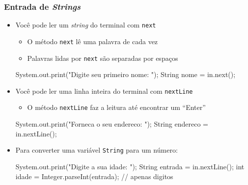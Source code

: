 \documentclass[xcolor={dvipsnames,table},aspectratio=169]{beamer}
\begin{document}
\begin{frame}[fragile]\frametitle{Entrada de \emph{Strings}}
\begin{itemize}
	\item Você pode ler um \emph{string} do terminal com \texttt{next}
	\begin{itemize}
		\item O método \texttt{next} lê uma palavra de cada vez
		\item Palavras lidas por \texttt{next} são separadas por espaços
	\end{itemize}
{\scriptsize
\begin{javacode}
System.out.print("Digite seu primeiro nome: ");
String nome = in.next();
\end{javacode}
}
	\item Você pode ler uma linha inteira do terminal com \texttt{nextLine}
	\begin{itemize}
		\item O método \texttt{nextLine} faz a leitura até encontrar um ``Enter''
	\end{itemize}
{\scriptsize
\begin{javacode}
System.out.print("Forneca o seu endereco: ");
String endereco = in.nextLine();
\end{javacode}
}
	\item Para converter uma variável \texttt{String} para um número:
{\scriptsize
\begin{javacode}
System.out.print("Digite a sua idade: ");
String entrada = in.nextLine();
int idade = Integer.parseInt(entrada); // apenas digitos
\end{javacode}
}
\end{itemize}
\end{frame}
\end{document}
